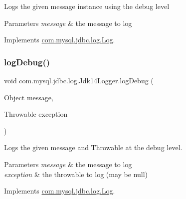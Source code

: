 Logs the given message instance using the \textquotesingle{}debug\textquotesingle{} level


\begin{DoxyParams}{Parameters}
{\em message} & the message to log \\
\hline
\end{DoxyParams}


Implements \mbox{\hyperlink{interfacecom_1_1mysql_1_1jdbc_1_1log_1_1_log_aa6f1e099156b6a444addba331704c2fe}{com.\+mysql.\+jdbc.\+log.\+Log}}.

\mbox{\label{classcom_1_1mysql_1_1jdbc_1_1log_1_1_jdk14_logger_a83874be2dc0c2bf71b731e7ef5115a69}} 
\subsubsection{\texorpdfstring{log\+Debug()}{logDebug()}\hspace{0.1cm}{\footnotesize\ttfamily [2/2]}}
{\footnotesize\ttfamily void com.\+mysql.\+jdbc.\+log.\+Jdk14\+Logger.\+log\+Debug (\begin{DoxyParamCaption}\item[{Object}]{message,  }\item[{Throwable}]{exception }\end{DoxyParamCaption})}

Logs the given message and Throwable at the \textquotesingle{}debug\textquotesingle{} level.


\begin{DoxyParams}{Parameters}
{\em message} & the message to log \\
\hline
{\em exception} & the throwable to log (may be null) \\
\hline
\end{DoxyParams}


Implements \mbox{\hyperlink{interfacecom_1_1mysql_1_1jdbc_1_1log_1_1_log_ae11c12bcf67d9681ab03e97b9098d28d}{com.\+mysql.\+jdbc.\+log.\+Log}}.

\mbox{\label{classcom_1_1mysql_1_1jdbc_1_1log_1_1_jdk14_logger_ac1c3bf70b677a9fb3a47415201d6fead}} 
